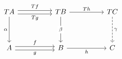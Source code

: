 \[\begin{tikzcd}
	TA && TB && TC \\
	\\
	A && B && C
	\arrow["f", shift left, from=3-1, to=3-3]
	\arrow["g"', shift right, from=3-1, to=3-3]
	\arrow["h"', from=3-3, to=3-5]
	\arrow["Tf", shift left, from=1-1, to=1-3]
	\arrow["Tg"', shift right, from=1-1, to=1-3]
	\arrow["Th", from=1-3, to=1-5]
	\arrow["\alpha"', from=1-1, to=3-1]
	\arrow["\beta"{description}, from=1-3, to=3-3]
	\arrow["\gamma", dashed, from=1-5, to=3-5]
\end{tikzcd}\]